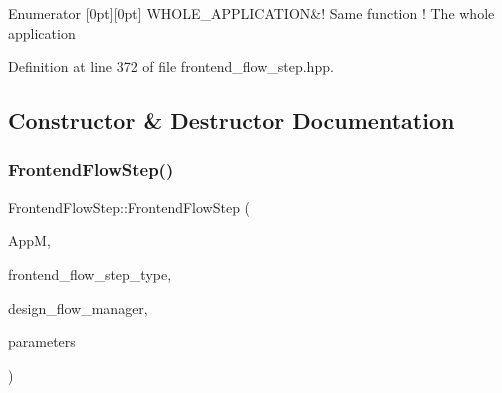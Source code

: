 \begin{DoxyEnumFields}{Enumerator}
[0pt][0pt]{}\mbox{\label{classFrontendFlowStep_af7cf30f2023e5b99e637dc2058289ab0a7842969c0b28d7b45f026ccf8b036e4a}} 
W\+H\+O\+L\+E\+\_\+\+A\+P\+P\+L\+I\+C\+A\+T\+I\+ON&! Same function ! The whole application \\
\hline

\end{DoxyEnumFields}


Definition at line 372 of file frontend\+\_\+flow\+\_\+step.\+hpp.



\subsection{Constructor \& Destructor Documentation}
\mbox{\label{classFrontendFlowStep_ac85d0661dfc22d982cc8abcaac10b2ae}} 
\subsubsection{\texorpdfstring{Frontend\+Flow\+Step()}{FrontendFlowStep()}}
{\footnotesize\ttfamily Frontend\+Flow\+Step\+::\+Frontend\+Flow\+Step (\begin{DoxyParamCaption}\item[{const \hyperlink{application__manager_8hpp_a04ccad4e5ee401e8934306672082c180}{application\+\_\+manager\+Ref}}]{AppM,  }\item[{const \hyperlink{frontend__flow__step_8hpp_afeb3716c693d2b2e4ed3e6d04c3b63bb}{Frontend\+Flow\+Step\+Type}}]{frontend\+\_\+flow\+\_\+step\+\_\+type,  }\item[{const Design\+Flow\+Manager\+Const\+Ref}]{design\+\_\+flow\+\_\+manager,  }\item[{const \hyperlink{Parameter_8hpp_a37841774a6fcb479b597fdf8955eb4ea}{Parameter\+Const\+Ref}}]{parameters }\end{DoxyParamCaption})}



